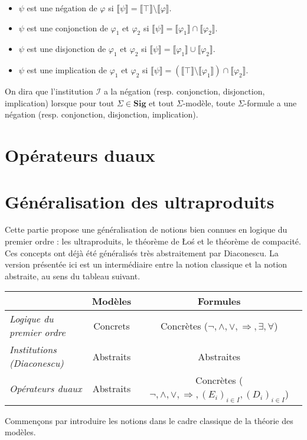\documentclass[11pt,a4paper]{article}
\newcommand{\ph}{\varphi}
\newcommand{\gr}{\textbf}
\newcommand{\il}{\textit}
\newcommand{\I}{\mathcal{I}}
\newcommand{\lb}{\llbracket}
\newcommand{\rb}{\rrbracket}
\begin{document}
\begin{itemize}
\setlength\itemsep{-0.3em}
\item $\psi$ est une négation de $\ph$ si $\lb \psi \rb = \lb \top \rb \setminus \lb \ph \rb$.
\item $\psi$ est une conjonction de $\ph_1$ et $\ph_2$ si $\lb \psi \rb = \lb \ph_1 \rb \cap \lb \ph_2 \rb$.
\item $\psi$ est une disjonction de $\ph_1$ et $\ph_2$ si $\lb \psi \rb = \lb \ph_1 \rb \cup \lb \ph_2 \rb$.
\item $\psi$ est une implication de $\ph_1$ et $\ph_2$ si $\lb \psi \rb = (\lb \top \rb \setminus \lb \ph_1 \rb) \cap \lb \ph_2 \rb$.
\end{itemize}
On dira que l'institution $\I$ a la négation (resp. conjonction, disjonction, implication) lorsque pour tout $\Sigma \in \gr{Sig}$ et tout $\Sigma$-modèle, toute $\Sigma$-formule a une négation (resp. conjonction, disjonction, implication).
\newpage
\section{Opérateurs duaux}
\newpage
\section{Généralisation des ultraproduits}
Cette partie propose une généralisation de notions bien connues en logique du premier ordre : les ultraproduits, le théorème de \L o\'s et le théorème de compacité. Ces concepts ont déjà été généralisés très abstraitement par Diaconescu. La version présentée ici est un intermédiaire entre la notion classique et la notion abstraite, au sens du tableau suivant.
\begin{center}
\begin{tabular}{|l|c|c|}
  \hline
   & \gr{Modèles} & \gr{Formules} \\
  \hline
  \il{Logique du premier ordre} & Concrets & Concrètes ($\neg,\wedge,\vee,\Rightarrow,\exists,\forall$)\\
  \hline
  \il{Institutions (Diaconescu)} & Abstraits & Abstraites \\
  \hline
  \il{Opérateurs duaux} & Abstraits & Concrètes ($\neg,\wedge,\vee,\Rightarrow,(E_i)_{i\in I},(D_i)_{i\in I}$) \\
  \hline
\end{tabular}
\end{center}
Commençons par introduire les notions dans le cadre classique de la théorie des modèles.
\end{document}
